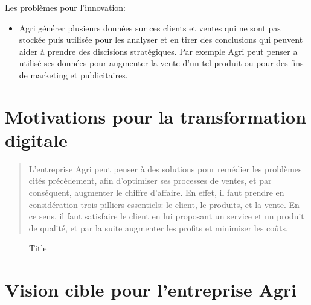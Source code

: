\documentclass[a4paper]{report}
\begin{document}
\begin{doublespace}
Les problèmes pour l'innovation:

\begin{itemize}
\item
  Agri générer plusieurs données sur ces clients et ventes qui ne sont
  pas stockée puis utilisée pour les analyser et en tirer des
  conclusions qui peuvent aider à prendre des discisions stratégiques.
  Par exemple Agri peut penser a utilisé ses données pour augmenter la
  vente d'un tel produit ou pour des fins de marketing et publicitaires.
\end{itemize}

\chapter{Motivations pour la transformation digitale}
\fancyhead[L]{\hspace*{5cm}}

\begin{quote}
L'entreprise Agri peut penser à des solutions pour remédier les
problèmes cités précédement, afin d'optimiser ses processes de ventes,
et par conséquent, augmenter le chiffre d'affaire. En effet, il faut
prendre en considération trois pilliers essentiels: le client, le
produits, et la vente. En ce sens, il faut satisfaire le client en lui
proposant un service et un produit de qualité, et par la suite augmenter
les profits et minimiser les coûts.
\end{quote}

\begin{figure}[H] 
	\begin{center}
		\caption{Title}
	\end{center}
\end{figure}

\chapter{Vision cible pour l'entreprise Agri}
\fancyhead[L]{\hspace*{5cm}}


\end{doublespace}
\end{document}
